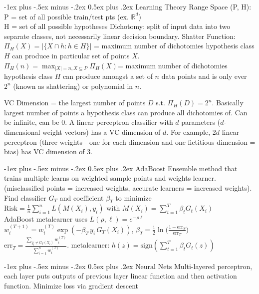 \documentclass[10pt,landscape]{article}
\makeatletter
\renewcommand{\section}{\@startsection{section}{1}{0mm}%
                                {-1ex plus -.5ex minus -.2ex}%
                                {0.5ex plus .2ex}%
                                {\normalfont\large\bfseries}}
\makeatother
\begin{document}
\begin{multicols}{3}
\section{$\boxed{\text{Learning Theory}}$}
Range Space (P, H):
P = set of all possible train/test pts (ex. $\mathbb R^d$)
\\
H = set of all possible hypotheses
Dichotomy: split of input data into two separate classes, not necessarily linear decision boundary. 
Shatter Function: $\Pi_H(X)=|\{X\cap h:h\in H\}|$ = maximum number of dichotomies hypothesis class $H$ can produce in particular set of points $X$.
$\displaystyle\Pi_{H}(n)=\max _{|X|=n, X \subseteq P} \Pi_{H}(X)$= maximum number of dichotomies hypothesis class $H$ can produce amongst a set of $n$ data points and is only ever $2^n$ (known as shattering) or polynomial in $n$.

VC Dimension = the largest number of points $D$ s.t. $\Pi_H(D) = 2^n$. Basically largest number of points a hypothesis class can produce all dichotomies of. Can be infinite, can be $0$.
A linear perceptron classifier with $d$ parameters ($d$-dimensional weight vectors) has a VC dimension of $d$. For example, 2$d$ linear perceptron (three weights - one for each dimension and one fictitious dimension = bias) has VC dimension of 3.

\section{$\boxed{\text{AdaBoost}}$}
Ensemble method that trains multiple learns on weighted sample points and weights learner. (misclassified points = increased weights, accurate learners = increased weights). Find classifier $G_T$ and coefficient $\beta_T$ to minimize\\
$\text{Risk} = \frac{1}{n} \sum_{i=1}^n L(M(X_i), y_i)$ with $M(X_i) = \sum_{t=1}^T \beta_t G_t(X_i)$\\ 
AdaBoost metalearner uses $L(\rho, \ell) = e^{-\rho \ell}$
$w_i^{(T + 1)} = w_i^{(T)} \exp(-\beta_T \, y_i \, G_T(X_i))$, $\beta_T = \frac{1}{2}\ln \bigg(\frac{1 - \mathrm{err}_T}{\mathrm{err}_T}\bigg)$
$\mathrm{err}_T = \frac{\sum_{y_i \neq G_T(X_i)}w_i^{(T)}}{\sum_{i = 1}^n w_i^{(T)}}.$ metalearner: $h(z) = \mathrm{sign}(\sum_{t=1}^T \beta_t G_t(z))$

\section{$\boxed{\text{Neural Nets}}$}
Multi-layered perceptron, each layer puts outputs of previous layer linear function and then activation function. Minimize loss via gradient descent


\end{multicols}
\end{document}

